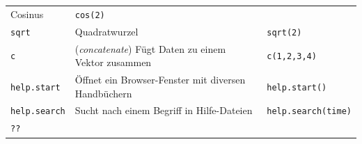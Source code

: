 \documentclass[]{book}
\begin{document}
\begin{longtable}[]{@{}lll@{}}
\begin{minipage}[t]{0.28\columnwidth}
Cosinus\strut
\end{minipage} & \begin{minipage}[t]{0.33\columnwidth}\raggedright
\texttt{cos(2)}\strut
\end{minipage}\tabularnewline
\begin{minipage}[t]{0.30\columnwidth}\raggedright
\texttt{sqrt}\strut
\end{minipage} & \begin{minipage}[t]{0.28\columnwidth}\raggedright
Quadratwurzel\strut
\end{minipage} & \begin{minipage}[t]{0.33\columnwidth}\raggedright
\texttt{sqrt(2)}\strut
\end{minipage}\tabularnewline
\begin{minipage}[t]{0.30\columnwidth}\raggedright
\texttt{c}\strut
\end{minipage} & \begin{minipage}[t]{0.28\columnwidth}\raggedright
(\emph{concatenate}) Fügt Daten zu einem Vektor zusammen\strut
\end{minipage} & \begin{minipage}[t]{0.33\columnwidth}\raggedright
\texttt{c(1,2,3,4)}\strut
\end{minipage}\tabularnewline
\begin{minipage}[t]{0.30\columnwidth}\raggedright
\texttt{help.start}\strut
\end{minipage} & \begin{minipage}[t]{0.28\columnwidth}\raggedright
Öffnet ein Browser-Fenster mit diversen Handbüchern\strut
\end{minipage} & \begin{minipage}[t]{0.33\columnwidth}\raggedright
\texttt{help.start()}\strut
\end{minipage}\tabularnewline
\begin{minipage}[t]{0.30\columnwidth}\raggedright
\texttt{help.search}\strut
\end{minipage} & \begin{minipage}[t]{0.28\columnwidth}\raggedright
Sucht nach einem Begriff in Hilfe-Dateien\strut
\end{minipage} & \begin{minipage}[t]{0.33\columnwidth}\raggedright
\texttt{help.search(\textquotesingle{}time\textquotesingle{})}\strut
\end{minipage}\tabularnewline
\begin{minipage}[t]{0.30\columnwidth}\raggedright
\texttt{??}\strut

\end{minipage}
\end{longtable}
\end{document}
